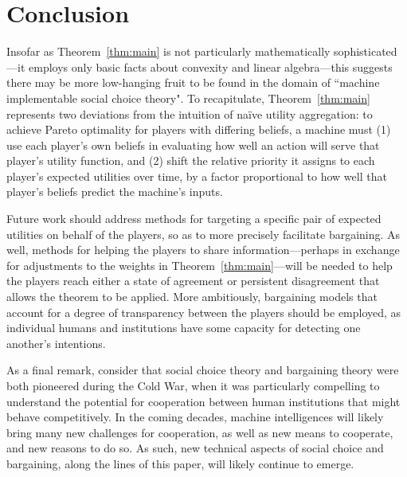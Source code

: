 \documentclass{article}
\newcommand{\thm}[1]{Theorem~\ref{thm:#1}}
\begin{document}
\section{Conclusion}

Insofar as \thm{main} is not particularly mathematically sophisticated---it employs only basic facts about convexity and linear algebra---this suggests there may be more low-hanging fruit to be found in the domain of ``machine implementable social choice theory".  To recapitulate, \thm{main} represents two deviations from the intuition of na\"{i}ve utility aggregation: to achieve Pareto optimality for players with differing beliefs, a machine must (1) use each player's own beliefs in evaluating how well an action will serve that player's utility function, and (2) shift the relative priority it assigns to each player's expected utilities over time, by a factor proportional to how well that player's beliefs predict the machine's inputs.

Future work should address methods for targeting a specific pair of expected utilities on behalf of the players, so as to more precisely facilitate bargaining.  As well, methods for helping the players to share information---perhaps in exchange for adjustments to the weights in \thm{main}---will be needed to help the players reach either a state of agreement or persistent disagreement that allows the theorem to be applied.  More ambitiously, bargaining models that account for a degree of transparency between the players should be employed, as individual humans and institutions have some capacity for detecting one another's intentions.

As a final remark, consider that social choice theory and bargaining theory were both pioneered during the Cold War, when it was particularly compelling to understand the potential for cooperation between human institutions that might behave competitively.  In the coming decades, machine intelligences will likely bring many new challenges for cooperation, as well as new means to cooperate, and new reasons to do so.  As such, new technical aspects of social choice and bargaining, along the lines of this paper, will likely continue to emerge.
\end{document}

